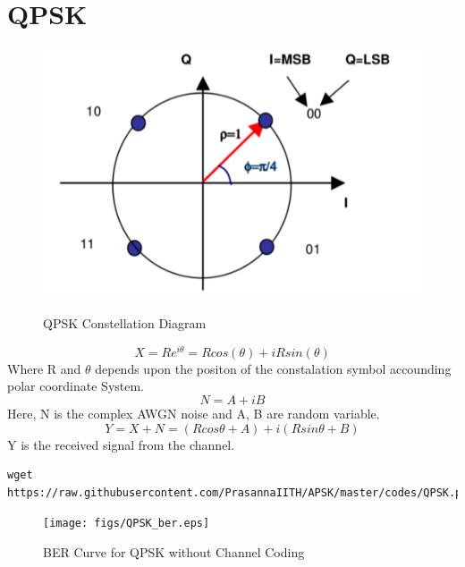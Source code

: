 \documentclass[journal,12pt,twocolumn]{IEEEtran}
\begin{document}
\section{QPSK}
\begin{figure}[h!]
\centering
\includegraphics[scale=0.4]{figs/qpsk_con}
\label{QPSK Constellation Diagram}
\caption{QPSK Constellation Diagram}
\end{figure}
$$X =Re^{i\theta} = Rcos(\theta) + iRsin(\theta)$$ 
Where R and $\theta$ depends upon the positon of the constalation symbol accounding polar coordinate System.
$$N = A + iB $$
Here, N is the complex AWGN noise and A, B are random variable.
$$ Y = X + N =(Rcos\theta + A) + i (Rsin\theta + B) $$
Y is the received signal from the channel.  
\begin{lstlisting}
wget https://raw.githubusercontent.com/PrasannaIITH/APSK/master/codes/QPSK.py
\end{lstlisting}
\begin{figure}[h!]
\centering
\texttt{[image: figs/QPSK\_ber.eps]}
\caption{\small{BER Curve for QPSK without Channel Coding}}
\label{BER Curve for QPSK without Channel Coding}
\end{figure}
\end{document}
